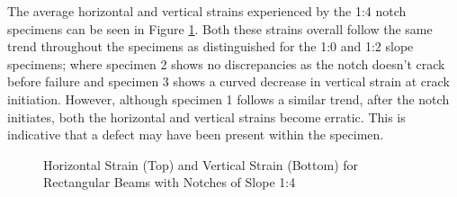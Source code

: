 \documentclass[11pt,a4paper]{article}
\numberwithin{equation}{subsection}
\begin{document}
\pagebreak

\noindent
The average horizontal and vertical strains experienced by the 1:4 notch specimens can be seen in Figure \ref{fig:Rect_14_Z_Y}. Both these strains overall follow the same trend throughout the specimens as distinguished for the 1:0 and 1:2 slope specimens; where specimen 2 shows no discrepancies as the notch doesn't crack before failure and specimen 3 shows a curved decrease in vertical strain at crack initiation. However, although specimen 1 follows a similar trend, after the notch initiates, both the horizontal and vertical strains become erratic. This is indicative that a defect may have been present within the specimen.

\pagebreak

\begin{figure}[h]
	\begin{center}
	\end{center}
	\caption{Horizontal Strain (Top) and Vertical Strain (Bottom) for Rectangular Beams with Notches of Slope 1:4}
	\label{fig:Rect_14_Z_Y}
\end{figure}
\end{document}
